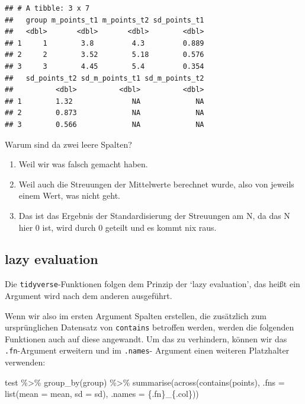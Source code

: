 \documentclass[
]{book}
\newenvironment{Shaded}{\begin{snugshade}}{\end{snugshade}}
\newcommand{\AttributeTok}[1]{\textcolor[rgb]{0.77,0.63,0.00}{#1}}
\newcommand{\FunctionTok}[1]{\textcolor[rgb]{0.00,0.00,0.00}{#1}}
\newcommand{\NormalTok}[1]{#1}
\newcommand{\SpecialCharTok}[1]{\textcolor[rgb]{0.00,0.00,0.00}{#1}}
\newcommand{\StringTok}[1]{\textcolor[rgb]{0.31,0.60,0.02}{#1}}
\providecommand{\tightlist}{%
  \setlength{\itemsep}{0pt}\setlength{\parskip}{0pt}}
\begin{document}
\begin{verbatim}
## # A tibble: 3 x 7
##   group m_points_t1 m_points_t2 sd_points_t1
##   <dbl>       <dbl>       <dbl>        <dbl>
## 1     1        3.8         4.3         0.889
## 2     2        3.52        5.18        0.576
## 3     3        4.45        5.4         0.354
##   sd_points_t2 sd_m_points_t1 sd_m_points_t2
##          <dbl>          <dbl>          <dbl>
## 1        1.32              NA             NA
## 2        0.873             NA             NA
## 3        0.566             NA             NA
\end{verbatim}

Warum sind da zwei leere Spalten?

\begin{enumerate}
\def\labelenumi{\arabic{enumi}.}
\tightlist
\item
  Weil wir was falsch gemacht haben.
\item
  Weil auch die Streuungen der Mittelwerte berechnet wurde, also von jeweils einem Wert, was nicht geht.
\item
  Das ist das Ergebnis der Standardisierung der Streuungen am N, da das N hier 0 ist, wird durch 0 geteilt und es kommt nix raus.
\end{enumerate}

\hypertarget{lazy-evaluation}{%
\subsection{lazy evaluation}\label{lazy-evaluation}}

Die \texttt{tidyverse}-Funktionen folgen dem Prinzip der `lazy evaluation', das heißt ein Argument wird nach dem anderen ausgeführt.

Wenn wir also im ersten Argument Spalten erstellen, die zusätzlich zum ursprünglichen Datensatz von \texttt{contains} betroffen werden, werden die folgenden Funktionen auch auf diese angewandt. Um das zu verhindern, können wir das \texttt{.fn}-Argument erweitern und im \texttt{.names}- Argument einen weiteren Platzhalter verwenden:

\begin{Shaded}
\begin{Highlighting}[]
\NormalTok{test }\SpecialCharTok{\%\textgreater{}\%} 
  \FunctionTok{group\_by}\NormalTok{(group) }\SpecialCharTok{\%\textgreater{}\%} 
  \FunctionTok{summarise}\NormalTok{(}\FunctionTok{across}\NormalTok{(}\FunctionTok{contains}\NormalTok{(}\StringTok{\textquotesingle{}points\textquotesingle{}}\NormalTok{),}
                   \AttributeTok{.fns =} \FunctionTok{list}\NormalTok{(}\AttributeTok{mean =}\NormalTok{ mean,}
                               \AttributeTok{sd =}\NormalTok{ sd), }
                   \AttributeTok{.names =} \StringTok{\textquotesingle{}\{.fn\}\_\{.col\}\textquotesingle{}}\NormalTok{))}
\end{Highlighting}
\end{Shaded}
\end{document}
